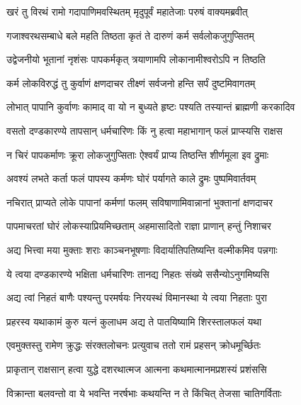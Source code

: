 
\twolineshloka
{खरं तु विरथं रामो गदापाणिमवस्थितम्}
{मृदुपूर्वं महातेजाः परुषं वाक्यमब्रवीत्} %

\twolineshloka
{गजाश्वरथसम्बाधे बले महति तिष्ठता}
{कृतं ते दारुणं कर्म सर्वलोकजुगुप्सितम्} %

\twolineshloka
{उद्वेजनीयो भूतानां नृशंसः पापकर्मकृत्}
{त्रयाणामपि लोकानामीश्वरोऽपि न तिष्ठति} %

\twolineshloka
{कर्म लोकविरुद्धं तु कुर्वाणं क्षणदाचर}
{तीक्ष्णं सर्वजनो हन्ति सर्पं दुष्टमिवागतम्} %

\twolineshloka
{लोभात् पापानि कुर्वाणः कामाद् वा यो न बुध्यते}
{हृष्टः पश्यति तस्यान्तं ब्राह्मणी करकादिव} %

\twolineshloka
{वसतो दण्डकारण्ये तापसान् धर्मचारिणः}
{किं नु हत्वा महाभागान् फलं प्राप्स्यसि राक्षस} %

\twolineshloka
{न चिरं पापकर्माणः क्रूरा लोकजुगुप्सिताः}
{ऐश्वर्यं प्राप्य तिष्ठन्ति शीर्णमूला इव द्रुमाः} %

\twolineshloka
{अवश्यं लभते कर्ता फलं पापस्य कर्मणः}
{घोरं पर्यागते काले द्रुमः पुष्पमिवार्तवम्} %

\twolineshloka
{नचिरात् प्राप्यते लोके पापानां कर्मणां फलम्}
{सविषाणामिवान्नानां भुक्तानां क्षणदाचर} %

\twolineshloka
{पापमाचरतां घोरं लोकस्याप्रियमिच्छताम्}
{अहमासादितो राज्ञा प्राणान् हन्तुं निशाचर} %

\twolineshloka
{अद्य भित्त्वा मया मुक्ताः शराः काञ्चनभूषणाः}
{विदार्यातिपतिष्यन्ति वल्मीकमिव पन्नगाः} %

\twolineshloka
{ये त्वया दण्डकारण्ये भक्षिता धर्मचारिणः}
{तानद्य निहतः संख्ये ससैन्योऽनुगमिष्यसि} %

\twolineshloka
{अद्य त्वां निहतं बाणैः पश्यन्तु परमर्षयः}
{निरयस्थं विमानस्था ये त्वया निहताः पुरा} %

\twolineshloka
{प्रहरस्व यथाकामं कुरु यत्नं कुलाधम}
{अद्य ते पातयिष्यामि शिरस्तालफलं यथा} %

\twolineshloka
{एवमुक्तस्तु रामेण क्रुद्धः संरक्तलोचनः}
{प्रत्युवाच ततो रामं प्रहसन् क्रोधमूर्च्छितः} %

\twolineshloka
{प्राकृतान् राक्षसान् हत्वा युद्धे दशरथात्मज}
{आत्मना कथमात्मानमप्रशस्यं प्रशंससि} %

\twolineshloka
{विक्रान्ता बलवन्तो वा ये भवन्ति नरर्षभाः}
{कथयन्ति न ते किंचित् तेजसा चातिगर्विताः} %

